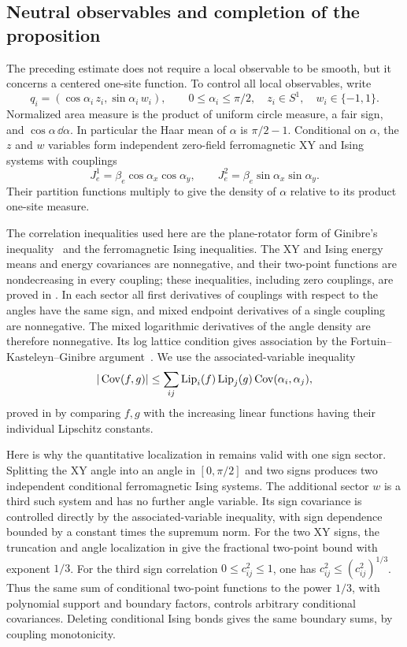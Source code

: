 \subsection{Neutral observables and completion of the proposition}

The preceding estimate does not require a local observable to be
smooth, but it concerns a centered one-site function. To control all
local observables, write
\[
 q_i=(\cos\alpha_i\,z_i,\sin\alpha_i\,w_i),\qquad
 0\le\alpha_i\le\pi/2,\quad z_i\in S^1,\quad w_i\in\{-1,1\}.
\]
Normalized area measure is the product of uniform circle measure, a
fair sign, and $\cos\alpha\,\dd\alpha$. In particular the Haar mean of
$\alpha$ is $\pi/2-1$. Conditional on $\alpha$, the $z$ and $w$
variables form independent zero-field ferromagnetic XY and Ising
systems with couplings
\[
 J_e^1=\beta_e\cos\alpha_x\cos\alpha_y,
 \qquad J_e^2=\beta_e\sin\alpha_x\sin\alpha_y.
\]
Their partition functions multiply to give the density of $\alpha$
relative to its product one-site measure.

The correlation inequalities used here are the plane-rotator form of
Ginibre's inequality~\cite{Ginibre1970} and the ferromagnetic Ising
inequalities. The XY and Ising energy means and energy covariances are nonnegative,
and their two-point functions are nondecreasing in every coupling;
these inequalities, including zero couplings, are proved in
. In each sector all first derivatives of couplings
with respect to the angles have the same sign, and mixed endpoint
derivatives of a single coupling are nonnegative. The mixed
logarithmic derivatives of the angle density are therefore
nonnegative. Its log lattice condition gives association by the
Fortuin--Kasteleyn--Ginibre argument~\cite{FortuinKasteleynGinibre1971}. We use the
associated-variable inequality
\begin{equation}
 |\operatorname{Cov}(f,g)|\le\sum_{ij}
 \operatorname{Lip}_i(f)\operatorname{Lip}_j(g)
 \operatorname{Cov}(\alpha_i,\alpha_j),
 \label{eq:prelim-association}
\end{equation}
proved in  by comparing $f,g$ with the increasing
linear functions having their individual Lipschitz constants.

Here is why the quantitative localization in
 remains valid with one sign sector. Splitting the XY
angle into an angle in $[0,\pi/2]$ and two signs produces two independent
conditional ferromagnetic Ising systems. The additional sector $w$
is a third such system and has no further angle variable.
Its sign covariance is controlled directly by the associated-variable
inequality, with sign dependence bounded by a constant times the
supremum norm. For the two XY signs, the truncation and angle
localization in  give the fractional two-point
bound with exponent $1/3$. For the third sign correlation
$0\le c^2_{ij}\le1$, one has $c^2_{ij}\le(c^2_{ij})^{1/3}$.
Thus the same sum of conditional two-point functions to the power
$1/3$, with polynomial support and boundary factors, controls arbitrary
conditional covariances. Deleting conditional Ising bonds gives the
same boundary sums, by coupling monotonicity.

